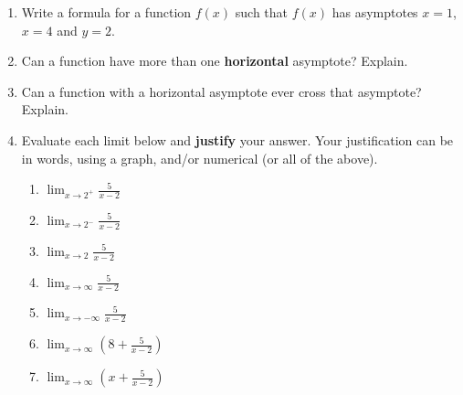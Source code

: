\documentclass[12pt]{article}
\renewcommand{\emph}[1]{\textsf{\textbf{#1}}}
\begin{document}
\begin{enumerate}
\vfill
\item Write a formula for a function $f(x)$ such that $f(x)$ has asymptotes $x=1$, $x=4$ and $y=2.$
\vspace{1in}
\newpage
\item Can a function have more than one \emph{horizontal} asymptote? Explain.
\vfill
\item Can a function with a horizontal asymptote ever cross that asymptote? Explain.
\vfill
\item Evaluate each limit below and \emph{justify} your answer. Your justification can be in words, using a graph, and/or numerical (or all of the above). 
	\begin{enumerate}
	\item $\displaystyle \lim_{x \to 2^+} \frac{5}{x-2}$\\ \vfill
	\item $\displaystyle \lim_{x \to 2^-} \frac{5}{x-2}$\\ \vfill
	\item $\displaystyle \lim_{x \to 2} \frac{5}{x-2}$\\ \vfill
	
	\item $\displaystyle \lim_{x \to \infty} \frac{5}{x-2}$\\ \vfill
	\item $\displaystyle \lim_{x \to -\infty} \frac{5}{x-2}$\\ \vfill
	\item $\displaystyle \lim_{x \to \infty} \left(8+\frac{5}{x-2}\right)$\\ \vfill
	\item $\displaystyle \lim_{x \to \infty} \left(x+\frac{5}{x-2}\right)$\\ \vfill
	\end{enumerate}	
\end{enumerate}
\end{document}
